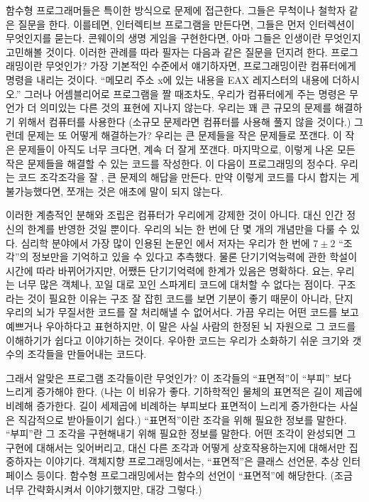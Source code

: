 함수형 프로그래머들은 특이한 방식으로 문제에 접근한다. 그들은 무척이나 철학자 같은 질문을 한다.
이를테면, 인터렉티브 프로그램을 만든다면, 그들은 먼저 인터렉션이 무엇인지를 묻는다.
콘웨이의 생명 게임을 구현한다면, 아마 그들은 인생이란 무엇인지 고민해볼 것이다.
이러한 관례를 따라 필자는 다음과 같은 질문을 던지려 한다. 프로그래밍이란 무엇인가?
가장 기본적인 수준에서 얘기하자면, 프로그래밍이란 컴퓨터에게 명령을 내리는 것이다.
``메모리 주소 x에 있는 내용을 EAX 레지스터의 내용에 더하시오.'' 
그러나 어셈블리어로 프로그램을 짤 때조차도, 우리가 컴퓨터에게 주는 명령은 무언가 더 의미있는 다른 것의 표현에 지나지 않는다.
우리는 꽤 큰 규모의 문제를 해결하기 위해서 컴퓨터를 사용한다 (소규모 문제라면 컴퓨터를 사용해 풀지 않을 것이다.)
그런데 문제는 또 어떻게 해결하는가? 우리는 큰 문제들을 작은 문제들로 쪼갠다. 
이 작은 문제들이 아직도 너무 크다면, 계속 더 잘게 쪼갠다.
마지막으로, 이렇게 나온 모든 작은 문제들을 해결할 수 있는 코드를 작성한다.
이 다음이 프로그래밍의 정수다.
우리는 코드 조각조각을 잘 , 큰 문제의 해답을 만든다. 
만약 이렇게 코드를 다시 합지는 게 불가능했다면, 쪼개는 것은 애초에 말이 되지 않는다.

이러한 계층적인 분해와 조립은 컴퓨터가 우리에게 강제한 것이 아니다.
대신 인간 정신의 한계를 반영한 것일 뿐이다. 우리의 뇌는 한 번에 단 몇 개의 개념만을 다룰 수 있다.
심리학 분야에서 가장 많이 인용된 논문인 
에서 저자는 우리가 한 번에 $7 \pm 2$ ``조각''의 정보만을 기억하고 있을 수 있다고 추측했다.
물론 단기기억능력에 관한 학설이 시간에 따라 바뀌어가지만, 어쨌든 단기기억력에 한계가 있음은 명확하다.
요는, 우리는 너무 많은 객체나, 꼬일 대로 꼬인 스파게티 코드에 대처할 수 없다는 점이다.
구조라는 것이 필요한 이유는 구조 잘 잡힌 코드를 보면 기분이 좋기 때문이 아니라,
단지 우리의 뇌가 무질서한 코드를 잘 처리해낼 수 없어서다.
가끔 우리는 어떤 코드를 보고 예쁘거나 우아하다고 표현하지만, 이 말은 사실
사람의 한정된 뇌 자원으로 그 코드를 이해하기가 쉽다고 이야기하는 것이다.
우아한 코드는 우리가 소화하기 쉬운 크기와 갯수의 조각들을 만들어내는 코드다.

그래서  알맞은 프로그램 조각들이란 무엇인가?
이 조각들의 ``표면적''이 ``부피'' 보다 느리게 증가해야 한다.
(나는 이 비유가 좋다. 기하학적인 물체의 표면적은 길이 제곱에 비례해 증가한다.
길이 세제곱에 비례하는 부피보다 표면적이 느리게 증가한다는 사실은 직감적으로 받아들이기 쉽다.)
``표면적''이란 조각을  위해 필요한 정보를 말한다.
``부피''란 그 조각을 구현해내기 위해 필요한 정보를 말한다.
어떤 조각이 완성되면 그 구현에 대해서는 잊어버리고,
대신 다른 조각과 어떻게 상호작용하는지에 대해서만 집중하자는 이야기다.
객체지향 프로그래밍에서는, ``표면적''은 클래스 선언문, 추상 인터페이스 등이다.
함수형 프로그래밍에서는 함수의 선언이 ``표면적''에 해당한다. (조금 너무 간략화시켜서 이야기했지만, 대강 그렇다.)

